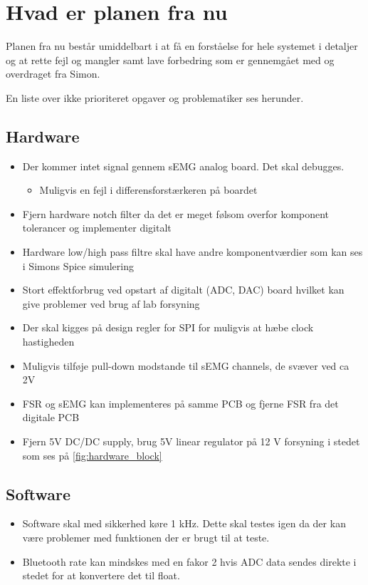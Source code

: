 \section{Hvad er planen fra nu}
Planen fra nu består umiddelbart i at få en forståelse for hele systemet i detaljer og at rette fejl og mangler samt lave forbedring som er gennemgået med og overdraget fra Simon. 

En liste over ikke prioriteret opgaver og problematiker ses herunder.

\subsection{Hardware}

\begin{itemize}
	\item Der kommer intet signal gennem sEMG analog board. Det skal debugges.
	\begin{itemize}
		\item Muligvis en fejl i differensforstærkeren på boardet
	\end{itemize}
	\item Fjern hardware notch filter da det er meget følsom overfor komponent tolerancer og implementer digitalt
	\item Hardware low/high pass filtre skal have andre komponentværdier som kan ses i Simons Spice simulering
	\item Stort effektforbrug ved opstart af digitalt (ADC, DAC) board hvilket kan give problemer ved brug af lab forsyning
	\item Der skal kigges på design regler for SPI for muligvis at hæbe clock hastigheden
	\item Muligvis tilføje pull-down modstande til sEMG channels, de svæver ved ca 2V
	\item FSR og sEMG kan implementeres på samme PCB og fjerne FSR fra det digitale PCB
	\item Fjern 5V DC/DC supply, brug 5V linear regulator på 12 V forsyning i stedet som ses på \autoref{fig:hardware_block} 
\end{itemize}


\subsection{Software}

\begin{itemize}
	\item Software skal med sikkerhed køre 1 kHz. Dette skal testes igen da der kan være problemer med funktionen der er brugt til at teste.
	\item Bluetooth rate kan mindskes med en fakor 2 hvis ADC data sendes direkte i stedet for at konvertere det til float.
\end{itemize}


